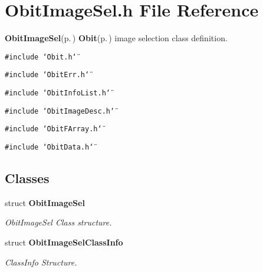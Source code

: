 \section{Obit\-Image\-Sel.h File Reference}
\label{ObitImageSel_8h}
{\bf Obit\-Image\-Sel}{\rm (p.\,\pageref{structObitImageSel})} {\bf Obit}{\rm (p.\,\pageref{structObit})} image selection class definition. 

{\tt \#include \char`\"{}Obit.h\char`\"{}}\par
{\tt \#include \char`\"{}Obit\-Err.h\char`\"{}}\par
{\tt \#include \char`\"{}Obit\-Info\-List.h\char`\"{}}\par
{\tt \#include \char`\"{}Obit\-Image\-Desc.h\char`\"{}}\par
{\tt \#include \char`\"{}Obit\-FArray.h\char`\"{}}\par
{\tt \#include \char`\"{}Obit\-Data.h\char`\"{}}\par
\subsection*{Classes}
\begin{CompactItemize}
\item 
struct {\bf Obit\-Image\-Sel}
\begin{CompactList}\small\item\em Obit\-Image\-Sel Class structure. \item\end{CompactList}\item 
struct {\bf Obit\-Image\-Sel\-Class\-Info}
\begin{CompactList}\small\item\em Class\-Info Structure. \item\end{CompactList}\end{CompactItemize}
